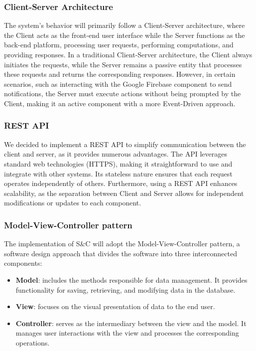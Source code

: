 \documentclass{article}
\begin{document}
\subsubsection{Client-Server Architecture}
The system's behavior will primarily follow a Client-Server architecture, where the Client acts as the front-end user interface while the Server functions as the back-end platform, processing user requests, performing computations, and providing responses.\newline
In a traditional Client-Server architecture, the Client always initiates the requests, while the Server remains a passive entity that processes these requests and returns the corresponding responses. However, in certain scenarios, such as interacting with the Google Firebase component to send notifications, the Server must execute actions without being prompted by the Client, making it an active component with a more Event-Driven approach.

\subsubsection{REST API}
We decided to implement a REST API to simplify communication between the client and server, as it provides numerous advantages. The API leverages standard web technologies (HTTPS), making it straightforward to use and integrate with other systems. Its stateless nature ensures that each request operates independently of others. Furthermore, using a REST API enhances scalability, as the separation between Client and Server allows for independent modifications or updates to each component.

\subsubsection{Model-View-Controller pattern}
The implementation of S\&C will adopt the Model-View-Controller pattern, a software design approach that divides the software into three interconnected components:
\begin{itemize} 
    \item \textbf{Model}: includes the methods responsible for data management. It provides functionality for saving, retrieving, and modifying data in the database.    
    \item \textbf{View}: focuses on the visual presentation of data to the end user.
    \item \textbf{Controller}: serves as the intermediary between the view and the model. It manages user interactions with the view and processes the corresponding operations.
\end{itemize}
\end{document}
